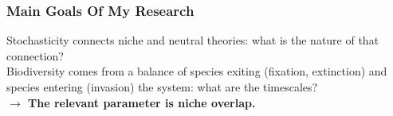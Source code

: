 \documentclass[dvipsnames]{beamer}
\begin{document}
\begin{frame}
\frametitle{Main Goals Of My Research}
\pause
\Large{
Stochasticity connects niche and neutral theories: what is the nature of that connection? \\
\pause
\vspace{0.6cm}
Biodiversity comes from a balance of species exiting (fixation, extinction) and species entering (invasion) the system: what are the timescales? \\%
}
\vspace{0.6cm}
\pause
\textbf{$\rightarrow$ The relevant parameter is niche overlap.} 
\end{frame}
\end{document}
